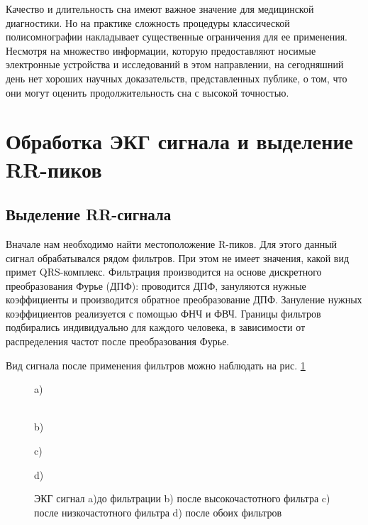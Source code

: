 Качество и длительность сна имеют важное значение для медицинской диагностики. Но на практике сложность процедуры классической полисомнографии накладывает существенные ограничения для ее применения. Несмотря на множество информации, которую предоставляют носимые электронные устройства и исследований в этом направлении, на сегодняшний день нет хороших научных доказательств, представленных публике, о том, что они могут оценить продолжительность сна с высокой точностью.

\section{Обработка ЭКГ сигнала и выделение RR-пиков}
\subsection{Выделение RR-сигнала}

Вначале нам необходимо найти местоположение R-пиков. Для этого данный сигнал обрабатывался рядом фильтров. При этом не имеет значения, какой вид примет QRS-комплекс. Фильтрация производится на основе дискретного преобразования Фурье (ДПФ): проводится ДПФ, зануляются нужные коэффициенты и производится обратное преобразование ДПФ. Зануление нужных коэффициентов реализуется с помощью ФНЧ и ФВЧ. Границы фильтров подбирались индивидуально для каждого человека, в зависимости от распределения частот после преобразования Фурье.

Вид сигнала после применения фильтров можно наблюдать на рис.  \ref{ris:filter_ekg}

\begin{figure}[h]
	\begin{minipage}[h]{0.47\linewidth}
		 a) \\
	\end{minipage}
	\hfill
	\begin{minipage}[h]{0.47\linewidth}
		 \\b)
	\end{minipage}
	\vfill
	\begin{minipage}[h]{0.47\linewidth}
		 c) \\
	\end{minipage}
	\hfill
	\begin{minipage}[h]{0.47\linewidth}
		 d) \\
	\end{minipage}
	\caption{ЭКГ сигнал a)до фильтрации b) после высокочастотного фильтра
		c) после низкочастотного фильтра d) после обоих фильтров}
	\label{ris:filter_ekg}
\end{figure}


